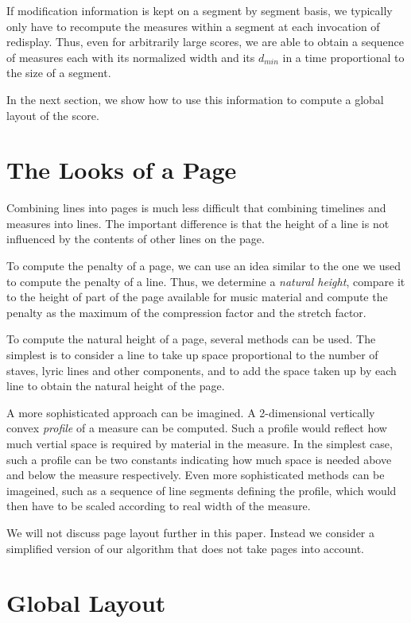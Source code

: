 \documentclass{article}
\begin{document}
If modification information is kept on a segment by segment basis,
we typically only have to recompute the measures within a segment at
each invocation of redisplay.  Thus, even for arbitrarily large
scores, we are able to obtain a sequence of measures each with its
normalized width and its $d_{min}$ in a time proportional to the
size of a segment. 

In the next section, we show how to use this information to compute a
global layout of the score. 


\section{The Looks of a Page}

Combining lines into pages is much less difficult that combining
timelines and measures into lines.  The important difference is that
the height of a line is not influenced by the contents of other lines
on the page. 

To compute the penalty of a page, we can use an idea similar to the
one we used to compute the penalty of a line.  Thus, we determine a
\emph{natural height}, compare it to the height of part of the page
available for music material and compute the penalty as the maximum of
the compression factor and the stretch factor. 

To compute the natural height of a page, several methods can be used.
The simplest is to consider a line to take up space proportional to
the number of staves, lyric lines and other components, and to add the
space taken up by each line to obtain the natural height of the page. 

A more sophisticated approach can be imagined.  A 2-dimensional
vertically convex \emph{profile} of a measure can be computed.  Such a
profile would reflect how much vertial space is required by material
in the measure.  In the simplest case, such a profile can be two
constants indicating how much space is needed above and below the
measure respectively.  Even more sophisticated methods can be
imageined, such as a sequence of line segments defining the profile,
which would then have to be scaled according to real width of the
measure. 

We will not discuss page layout further in this paper.  Instead we
consider a simplified version of our algorithm that does not take
pages into account. 

\section{Global Layout}
\end{document}
